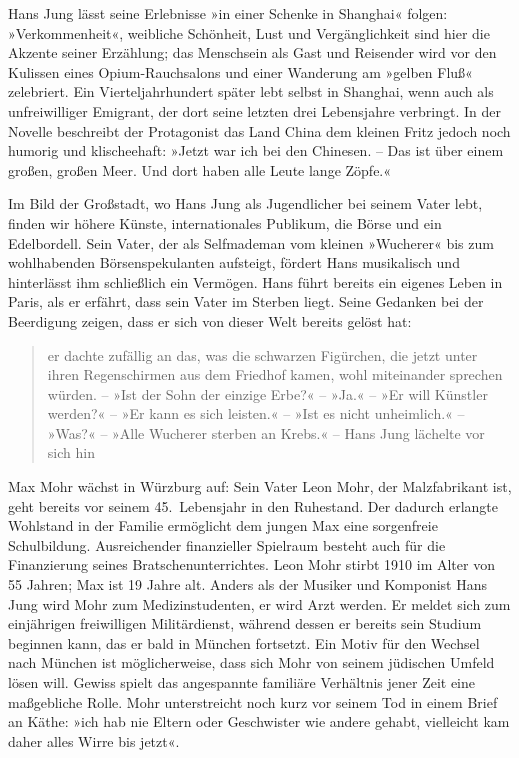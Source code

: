 \begin{small}
Hans Jung lässt seine Erlebnisse »in einer Schenke in Shanghai«
folgen: »Verkommenheit«, weibliche Schönheit, Lust und Vergänglichkeit
sind hier die Akzente seiner Erzählung; das Menschsein
als Gast und Reisender wird vor den Kulissen
eines Opium-Rauchsalons und einer Wanderung am
»gelben Fluß« zelebriert.%
Ein Vierteljahrhundert später lebt \buchautor{} selbst in Shanghai, wenn auch
als unfreiwilliger Emigrant, der dort seine letzten drei Lebensjahre
verbringt. In der Novelle beschreibt der Protagonist das Land China dem kleinen
Fritz jedoch noch humorig und klischeehaft: »Jetzt war ich bei den
Chinesen. – Das ist über einem großen, großen Meer. Und dort haben
alle Leute lange Zöpfe.«

Im Bild der Großstadt,
wo Hans Jung als
Jugendlicher bei seinem Vater lebt, finden wir höhere Künste,
internationales Publikum, die Börse und ein Edelbordell. Sein Vater, der
als Selfmademan vom kleinen »Wucherer« bis zum wohlhabenden Börsenspekulanten aufsteigt,
fördert Hans musikalisch und hinterlässt ihm schließlich ein Vermögen.
Hans führt bereits ein eigenes Leben in Paris, als er erfährt,
dass sein Vater im Sterben liegt. Seine Gedanken bei der
Beerdigung zeigen, dass er sich von dieser Welt bereits gelöst hat:

\begin{quote}
 er
dachte zufällig an das, was die schwarzen Figürchen,
die jetzt unter ihren Regenschirmen aus dem Friedhof
kamen, wohl miteinander sprechen würden. – »Ist
der Sohn der einzige Erbe?« – »Ja.« – »Er will
Künstler werden?« – »Er kann es sich leisten.« –
»Ist es nicht unheimlich.« – »Was?« – »Alle
Wucherer sterben an Krebs.« – Hans Jung lächelte
vor sich hin 
\end{quote}

Max Mohr wächst in Würzburg auf: Sein Vater Leon Mohr, der Malz\-fabrikant
ist, geht bereits vor seinem 45.\ Lebensjahr in den Ruhestand.
Der dadurch erlangte Wohlstand in der Familie ermöglicht dem jungen Max eine
sorgenfreie Schulbildung. Ausreichender finanzieller Spielraum besteht
auch für die Finanzierung seines Bratschenunterrichtes.%
Leon Mohr stirbt 1910 im Alter von 55 Jahren; Max ist 19 Jahre alt.
Anders als der Musiker und Komponist Hans Jung wird Mohr zum Medizinstudenten,
er wird Arzt werden. Er meldet sich zum einjährigen freiwilligen Militärdienst,
während dessen er bereits sein
Studium beginnen kann, das er bald in München fortsetzt.%
Ein Motiv für den Wechsel nach München ist möglicherweise,
dass sich Mohr von seinem jüdischen Umfeld lösen will.%
Gewiss spielt das angespannte familiäre Verhältnis jener Zeit eine maßgebliche
Rolle. Mohr unterstreicht noch
kurz vor seinem Tod in einem Brief an Käthe: »ich hab nie Eltern
oder Geschwister wie andere gehabt, vielleicht kam daher alles
Wirre bis jetzt«.


\end{small}
